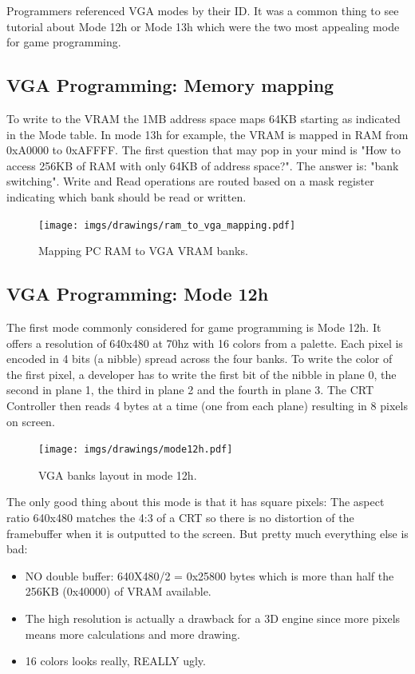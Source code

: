 \documentclass[book.tex]{subfiles}
\begin{document}
 Programmers referenced VGA modes by their ID. It was a common thing to see tutorial about Mode 12h or Mode 13h which were the two most appealing mode for game programming.


 \subsection{VGA Programming: Memory mapping}
To write to the VRAM the 1MB address space maps 64KB starting as indicated in the Mode table. In mode 13h for example, the VRAM is mapped in RAM from 0xA0000 to 0xAFFFF. The first question that may pop in your mind is "How to access 256KB of RAM with only 64KB of address space?". The answer is: "bank switching". Write and Read operations are routed based on a mask register indicating which bank should be read or written.\\
\par
 \begin{figure}[H]
\centering
  
      \texttt{[image: imgs/drawings/ram\_to\_vga\_mapping.pdf]}
    
\caption{Mapping PC RAM to VGA VRAM banks.}
\end{figure}



 

 \subsection{VGA Programming: Mode 12h}
 The first mode commonly considered for game programming is Mode 12h. It offers a resolution of 640x480 at 70hz with 16 colors from a palette. Each pixel is encoded in 4 bits (a nibble) spread across the four banks. To write the color of the first pixel, a developer has to write the first bit of the nibble in plane 0, the second in plane 1, the third in plane 2 and the fourth in plane 3. The CRT Controller then reads 4 bytes at a time (one from each plane) resulting in 8 pixels on screen.\\
\par
\begin{figure}[H]
\centering
 \texttt{[image: imgs/drawings/mode12h.pdf]}
\caption{VGA banks layout in mode 12h.}
\end{figure}
\par

The only good thing about this mode is that it has square pixels: The aspect ratio 640x480 matches the 4:3 of a CRT so there is no distortion of the framebuffer when it is outputted to the screen. But pretty much everything else is bad:\\
\begin{itemize}
\item NO double buffer: 640X480/2 = 0x25800 bytes which is more than half the 256KB (0x40000) of VRAM available.
\item The high resolution is actually a drawback for a 3D engine since more pixels means more calculations and more drawing.
\item 16 colors looks really, REALLY ugly.
\end{itemize}
\end{document}
